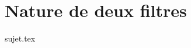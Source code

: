\documentclass[a4paper, 12pt, garamond]{book}
\begin{document}

\chapter{Nature de deux filtres}
\resetQ
{sujet.tex}
\end{document}
